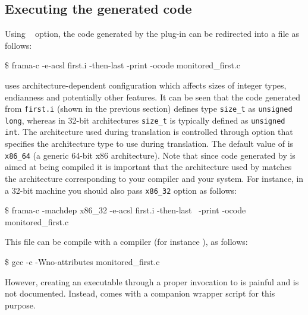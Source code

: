 
\subsection{Executing the generated code}
\label{sec:exec}

Using  \framac~\cite{userman} option, the code generated by the
\eacsl plug-in can be redirected into a file as follows:
\begin{frama-c-commands}
\$ frama-c -e-acsl first.i -then-last -print -ocode monitored_first.c
\end{frama-c-commands}

\framac uses architecture-dependent configuration which
affects sizes of integer types, endianness and potentially other features.  It
can be seen that the code generated from \texttt{first.i} (shown in the
previous section) defines \C type \texttt{size\_t} as \texttt{unsigned long}, whereas
in 32-bit architectures \texttt{size\_t} is typically defined as
\texttt{unsigned int}. The architecture used during \framac translation is
controlled through \framac {} option that specifies the
architecture type to use during translation.  The default value of
 is \texttt{x86\_64} (a generic 64-bit x86 architecture).
Note that since code generated by \eacsl is aimed at being compiled it is
important that the architecture used by \framac matches the architecture
corresponding to your compiler and your system. For instance, in a 32-bit
machine you should also pass
 \texttt{x86\_32} option as follows:
\begin{frama-c-commands}
\$ frama-c -machdep x86_32 -e-acsl first.i -then-last \
  -print -ocode monitored_first.c
\end{frama-c-commands}

This file can be compile with a \C compiler (for instance \gcc), as follows:

\lstset{escapechar=£}
\begin{frama-c-commands}
\$ gcc -c -Wno-attributes monitored_first.c
\end{frama-c-commands}

However, creating an executable through a proper invocation to \gcc is painful
and is not documented. Instead, \eacsl comes with a companion wrapper script for
this purpose.


